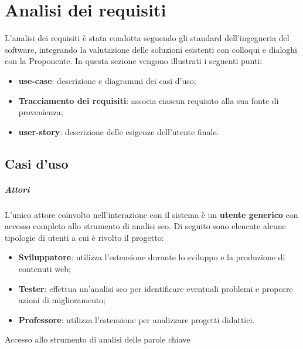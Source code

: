 \chapter{Analisi dei requisiti}
\label{cap:analisi-requisiti}

\par L'analisi dei \gls{requisiti} è stata condotta seguendo gli standard dell'ingegneria del software, integrando la valutazione delle soluzioni esistenti con colloqui e dialoghi con la Proponente. In questa sezione vengono illustrati i seguenti punti:
\begin{itemize}
    \item \textbf{\Gls{use-case}}: descrizione e diagrammi dei casi d'uso;
    \item \textbf{Tracciamento dei requisiti}: associa ciascun requisito alla sua fonte di provenienza;
    \item \textbf{\Gls{user-story}}: descrizione delle esigenze dell’utente finale.
\end{itemize}

\section{Casi d'uso}

\paragraph*{Attori}
\par L'unico attore coinvolto nell'interazione con il sistema è un \textbf{utente generico} con accesso completo allo strumento di analisi \gls{seo}. Di seguito sono elencate alcune tipologie di utenti a cui è rivolto il progetto:
\begin{itemize}
    \item \textbf{Sviluppatore}: utilizza l'estensione durante lo sviluppo e la produzione di contenuti web;
    \item \textbf{Tester}: effettua un'analisi \gls{seo} per identificare eventuali problemi e proporre azioni di miglioramento;
    \item \textbf{Professore}: utilizza l'estensione per analizzare progetti didattici.
\end{itemize}

\begin{usecase}{1}{Accesso allo strumento di analisi delle parole chiave}\label{UC1}
\end{usecase}

